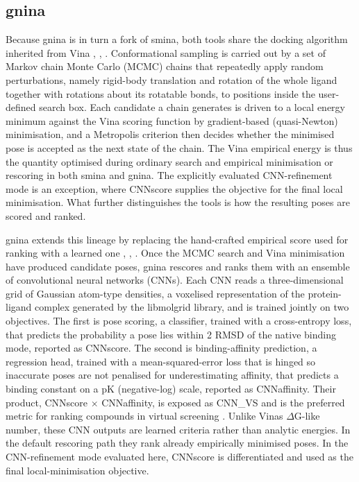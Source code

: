 \hypertarget{gnina-1}{%
\subsection{gnina}\label{gnina-1}}

Because gnina is in turn a fork of smina, both tools share the docking algorithm inherited from Vina \cite{ref056}, \cite{ref067}, \cite{ref068}. Conformational sampling is carried out by a set of Markov chain Monte Carlo (MCMC) chains that repeatedly apply random perturbations, namely rigid-body translation and rotation of the whole ligand together with rotations about its rotatable bonds, to positions inside the user-defined search box. Each candidate a chain generates is driven to a local energy minimum against the Vina scoring function by gradient-based (quasi-Newton) minimisation, and a Metropolis criterion then decides whether the minimised pose is accepted as the next state of the chain. The Vina empirical energy is thus the quantity optimised during ordinary search and empirical minimisation or rescoring in both smina and gnina. The explicitly evaluated CNN-refinement mode is an exception, where CNNscore supplies the objective for the final local minimisation. What further distinguishes the tools is how the resulting poses are scored and ranked.

gnina extends this lineage by replacing the hand-crafted empirical score used for ranking with a learned one \cite{ref056}, \cite{ref067}, \cite{ref068}. Once the MCMC search and Vina minimisation have produced candidate poses, gnina rescores and ranks them with an ensemble of convolutional neural networks (CNNs). Each CNN reads a three-dimensional grid of Gaussian atom-type densities, a voxelised representation of the protein-ligand complex generated by the libmolgrid library, and is trained jointly on two objectives. The first is pose scoring, a classifier, trained with a cross-entropy loss, that predicts the probability a pose lies within 2\angstrom{} RMSD of the native binding mode, reported as CNNscore. The second is binding-affinity prediction, a regression head, trained with a mean-squared-error loss that is hinged so inaccurate poses are not penalised for underestimating affinity, that predicts a binding constant on a pK (negative-log) scale, reported as CNNaffinity. Their product, CNNscore \ensuremath{\times} CNNaffinity, is exposed as CNN\_VS and is the preferred metric for ranking compounds in virtual screening \cite{ref068}. Unlike Vina\textquotesingle s \ensuremath{\Delta}G-like number, these CNN outputs are learned criteria rather than analytic energies. In the default rescoring path they rank already empirically minimised poses. In the CNN-refinement mode evaluated here, CNNscore is differentiated and used as the final local-minimisation objective.

